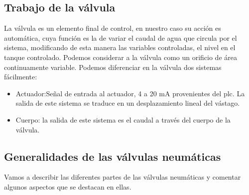 \subsection{Trabajo de la válvula}
La válvula es un elemento final de control, en nuestro caso su acción es
automática, cuya función es la de variar el caudal de agua que circula por el
sistema, modificando de esta manera las variables controladas, el nivel en el
tanque controlado. Podemos considerar a la válvula como un orificio de área 
continuamente variable.
Podemos diferenciar en la válvula dos sistemas fácilmente:

   \begin{itemize}
      \item Actuador:Señal de entrada al actuador, 4 a 20 mA provenientes del 
      \gls{plc}.
      La salida de este sistema se traduce en un desplazamiento lineal del 
      vástago.
      \item Cuerpo: la salida de este sistema es el caudal a través del cuerpo
      de la válvula.
    \end{itemize}
    
\subsection{Generalidades de las válvulas neumáticas}
Vamos a describir las diferentes partes de las válvulas neumáticas y comentar 
algunos aspectos que se destacan en ellas.

